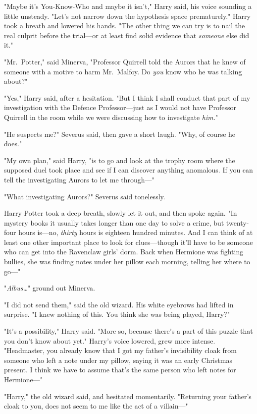 "Maybe it's You-Know-Who and maybe it isn't," Harry said, his voice sounding a
little unsteady. "Let's not narrow down the hypothesis space prematurely."
Harry took a breath and lowered his hands. "The other thing we can try is to
nail the real culprit before the trial---or at least find solid evidence that
\emph{someone} else did it."

"Mr.~Potter," said Minerva, "Professor Quirrell told the Aurors that he knew of
someone with a motive to harm Mr.~Malfoy. Do \emph{you} know who he was talking
about?"

"Yes," Harry said, after a hesitation. "But I think I shall conduct that part
of my investigation with the Defence Professor---just as I would not have
Professor Quirrell in the room while we were discussing how to investigate
\emph{him.}"

"He suspects me?" Severus said, then gave a short laugh. "Why, of course he
does."

"My own plan," said Harry, "is to go and look at the trophy room where the supposed
duel took place and see if I can discover anything anomalous. If you can tell
the investigating Aurors to let me through---"

"What investigating Aurors?" Severus said tonelessly.

Harry Potter took a deep breath, slowly let it out, and then spoke again. "In
mystery books it usually takes longer than one day to solve a crime, but
twenty-four hours is---no, \emph{thirty} hours is eighteen hundred minutes. And
I can think of at least one other important place to look for clues---though
it'll have to be someone who can get into the Ravenclaw girls' dorm. Back when
Hermione was fighting bullies, she was finding notes under her pillow each
morning, telling her where to go---"

"\emph{Albus{\ldots}}" ground out Minerva.

"I did not send them," said the old wizard. His white eyebrows had lifted in
surprise. "I knew nothing of this. You think she was being played, Harry?"

"It's a possibility," Harry said. "More so, because there's a part of this
puzzle that you don't know about yet." Harry's voice lowered, grew more
intense. "Headmaster, you already know that I got my father's invisibility
cloak from someone who left a note under my pillow, saying it was an early
Christmas present. I think we have to assume that's the same person who left
notes for Hermione---"

"Harry," the old wizard said, and hesitated momentarily. "Returning your
father's cloak to you, does not seem to me like the act of a villain---"

